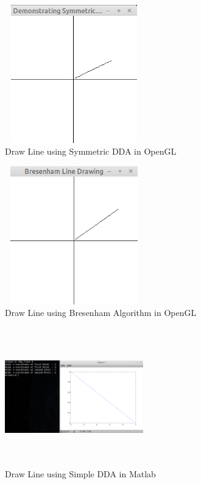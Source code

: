 \begin{figure}[ht!]
\centering
\includegraphics[width=60mm, height=60mm]{line_symmetric.png}
\caption{Draw Line using Symmetric DDA in OpenGL \label{overflow}}
\end{figure}

\begin{figure}[ht!]
\centering
\includegraphics[width=60mm, height=60mm]{line_bresenham.png}
\caption{Draw Line using Bresenham Algorithm in OpenGL \label{overflow}}
\end{figure}

\begin{figure}[ht!]
\centering
\includegraphics[width=60mm, height=60mm]{line_simple_matlab.png}
\caption{Draw Line using Simple DDA in Matlab \label{overflow}}
\end{figure}

